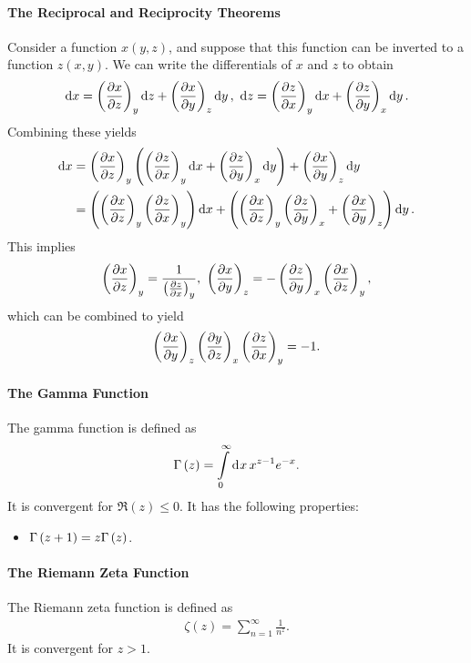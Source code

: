 \paragraph{The Reciprocal and Reciprocity Theorems}
Consider a function $x(y, z)$, and suppose that this function can be inverted to a function $z(x, y)$. We can write the differentials of $x$ and $z$ to obtain
\begin{align*}
	\dd{x} = \fix{\pdv{x}{z}}{y}\dd{z} + \fix{\pdv{x}{y}}{z}\dd{y},\ \dd{z} = \fix{\pdv{z}{x}}{y}\dd{x} + \fix{\pdv{z}{y}}{x}\dd{y}.
\end{align*}
Combining these yields
\begin{align*}
	\dd{x} &= \left(\pdv{x}{z}\right)_{y}\left(\left(\pdv{z}{x}\right)_{y}\dd{x} + \left(\pdv{z}{y}\right)_{x}\dd{y}\right) + \left(\pdv{x}{y}\right)_{z}\dd{y} \\
	       &= \left(\left(\pdv{x}{z}\right)_{y}\left(\pdv{z}{x}\right)_{y}\right)\dd{x} + \left(\left(\pdv{x}{z}\right)_{y}\left(\pdv{z}{y}\right)_{x} + \left(\pdv{x}{y}\right)_{z}\right)\dd{y}.
\end{align*}
This implies
\begin{align*}
	\fix{\pdv{x}{z}}{y} = \frac{1}{\fix{\pdv{z}{x}}{y}},\ \fix{\pdv{x}{y}}{z} = -\fix{\pdv{z}{y}}{x}\fix{\pdv{x}{z}}{y},
\end{align*}
which can be combined to yield
\begin{align*}
	 \left(\pdv{x}{y}\right)_{z}\left(\pdv{y}{z}\right)_{x}\left(\pdv{z}{x}\right)_{y} = -1.
\end{align*}

\paragraph{The Gamma Function}
The gamma function is defined as
\begin{align*}
	\Gamma\left(z\right) = \int\limits_{0}^{\infty}\dd[]{x}x^{z - 1}e^{-x}.
\end{align*}
It is convergent for $\Re(z) \leq 0$. It has the following properties:
\begin{itemize}
	\item $\Gamma\left(z + 1\right) = z\Gamma\left(z\right)$.
\end{itemize}

\paragraph{The Riemann Zeta Function}
The Riemann zeta function is defined as
\begin{align*}
	\zeta(z) = \sum\limits_{n = 1}^{\infty}\frac{1}{n^{z}}.
\end{align*}
It is convergent for $z > 1$.

